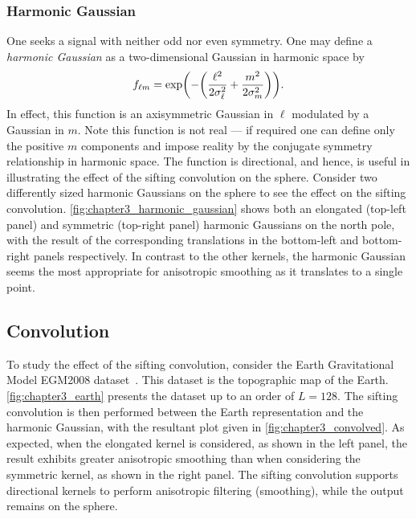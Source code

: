\subsubsection{Harmonic Gaussian}

One seeks a signal with neither odd nor even symmetry.
One may define a \emph{harmonic Gaussian} as a two-dimensional Gaussian in harmonic space by
%
\begin{equation}\label{eq:chapter3_harmonic_gaussian}
    {f}_{\ell m}
    = \exp(-\bigg(\frac{{\ell}^{2}}{2\sigma_{\ell}^{2}} + \frac{{m}^{2}}{2\sigma_{m}^{2}}\bigg)).
\end{equation}
%
In effect, this function is an axisymmetric Gaussian in \(\ell{}\) modulated by a Gaussian in \(m\).
Note this function is not real --- if required one can define only the positive \(m\) components and impose reality by the conjugate symmetry relationship in harmonic space.
The function is directional, and hence, is useful in illustrating the effect of the sifting convolution on the sphere.
Consider two differently sized harmonic Gaussians on the sphere to see the effect on the sifting convolution.
\cref{fig:chapter3_harmonic_gaussian} shows both an elongated (top-left panel) and symmetric (top-right panel) harmonic Gaussians on the north pole, with the result of the corresponding translations in the bottom-left and bottom-right panels respectively.
In contrast to the other kernels, the harmonic Gaussian seems the most appropriate for anisotropic smoothing as it translates to a single point.



\subsection{Convolution}\label{sec:chapter3_convolution}

To study the effect of the sifting convolution, consider the Earth Gravitational Model EGM2008 dataset~\cite{Pavlis2013}.
This dataset is the topographic map of the Earth.
\cref{fig:chapter3_earth} presents the dataset up to an order of \(L=128\).
The sifting convolution is then performed between the Earth representation and the harmonic Gaussian, with the resultant plot given in \cref{fig:chapter3_convolved}.
As expected, when the elongated kernel is considered, as shown in the left panel, the result exhibits greater anisotropic smoothing than when considering the symmetric kernel, as shown in the right panel.
The sifting convolution supports directional kernels to perform anisotropic filtering (smoothing), while the output remains on the sphere.

